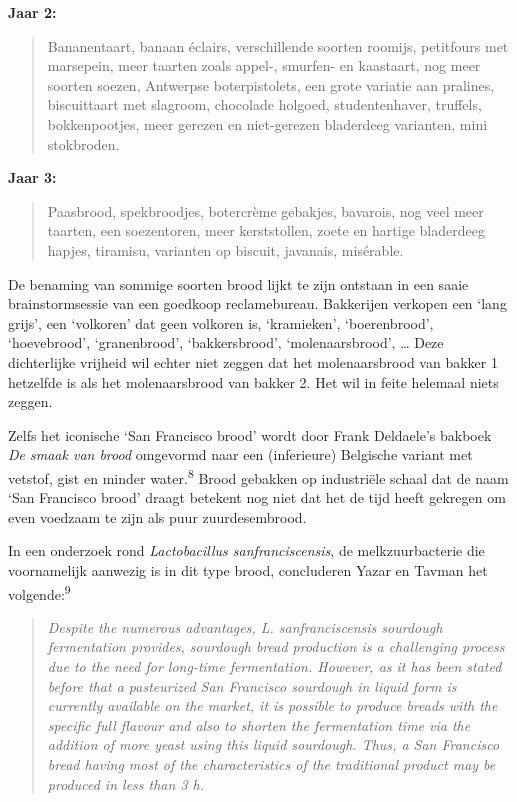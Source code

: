\documentclass[
  11pt,
  dutch,
]{memoir}
\begin{document}
\textbf{Jaar 2:}

\begin{quote}
Bananentaart, banaan éclairs, verschillende soorten roomijs, petitfours
met marsepein, meer taarten zoals appel-, smurfen- en kaastaart, nog
meer soorten soezen, Antwerpse boterpistolets, een grote variatie aan
pralines, biscuittaart met slagroom, chocolade holgoed, studentenhaver,
truffels, bokkenpootjes, meer gerezen en niet-gerezen bladerdeeg
varianten, mini stokbroden.
\end{quote}

\textbf{Jaar 3:}

\begin{quote}
Paasbrood, spekbroodjes, botercrème gebakjes, bavarois, nog veel meer
taarten, een soezentoren, meer kerststollen, zoete en hartige bladerdeeg
hapjes, tiramisu, varianten op biscuit, javanais, misérable.
\end{quote}

De benaming van sommige soorten brood lijkt te zijn ontstaan in een
saaie brainstormsessie van een goedkoop reclamebureau. Bakkerijen
verkopen een `lang grijs', een `volkoren' dat geen volkoren is,
`kramieken', `boerenbrood', `hoevebrood', `granenbrood', `bakkersbrood',
`molenaarsbrood', \ldots{} Deze dichterlijke vrijheid wil echter niet
zeggen dat het molenaarsbrood van bakker 1 hetzelfde is als het
molenaarsbrood van bakker 2. Het wil in feite helemaal niets zeggen.

Zelfs het iconische `San Francisco brood' wordt door Frank Deldaele's
bakboek \emph{De smaak van brood} omgevormd naar een (inferieure)
Belgische variant met vetstof, gist en minder water.\textsuperscript{8}
Brood gebakken op industriële schaal dat de naam `San Francisco brood'
draagt betekent nog niet dat het de tijd heeft gekregen om even voedzaam
te zijn als puur zuurdesembrood.

In een onderzoek rond \emph{Lactobacillus sanfranciscensis}, de
melkzuurbacterie die voornamelijk aanwezig is in dit type brood,
concluderen Yazar en Tavman het volgende:\textsuperscript{9}

\begin{quote}
\emph{Despite the numerous advantages, L. sanfranciscensis sourdough
fermentation provides, sourdough bread production is a challenging
process due to the need for long-time fermentation. However, as it has
been stated before that a pasteurized San Francisco sourdough in liquid
form is currently available on the market, it is possible to produce
breads with the specific full flavour and also to shorten the
fermentation time via the addition of more yeast using this liquid
sourdough. Thus, a San Francisco bread having most of the
characteristics of the traditional product may be produced in less than
3 h.}
\end{quote}
\end{document}
